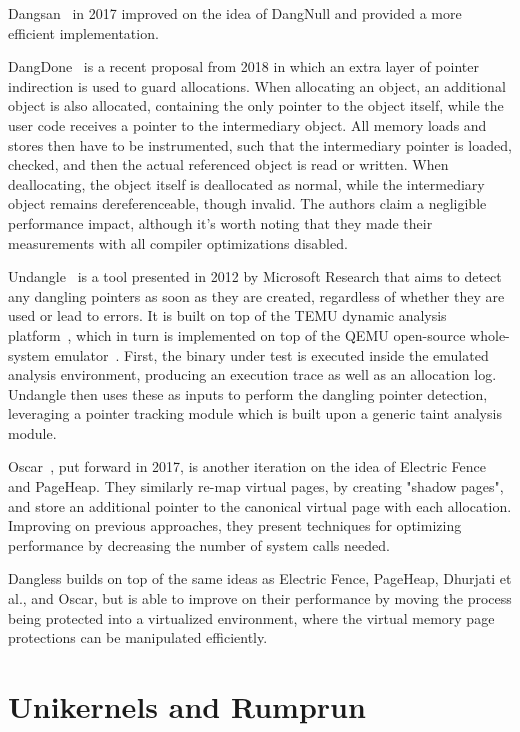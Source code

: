 Dangsan~\cite{dangsan2017} in 2017 improved on the idea of DangNull and provided a more efficient implementation.

DangDone~\cite{dangdone2018} is a recent proposal from 2018 in which an extra layer of pointer indirection is used to guard allocations. When allocating an object, an additional object is also allocated, containing the only pointer to the object itself, while the user code receives a pointer to the intermediary object. All memory loads and stores then have to be instrumented, such that the intermediary pointer is loaded, checked, and then the actual referenced object is read or written. When deallocating, the object itself is deallocated as normal, while the intermediary object remains dereferenceable, though invalid. The authors claim a negligible performance impact, although it's worth noting that they made their measurements with all compiler optimizations disabled.

Undangle~\cite{undangle2012} is a tool presented in 2012 by Microsoft Research that aims to detect any dangling pointers as soon as they are created, regardless of whether they are used or lead to errors. It is built on top of the TEMU dynamic analysis platform~\cite{bitblaze-temu2008}, which in turn is implemented on top of the QEMU open-source whole-system emulator~\cite{qemu-web}. First, the binary under test is executed inside the emulated analysis environment, producing an execution trace as well as an allocation log. Undangle then uses these as inputs to perform the dangling pointer detection, leveraging a pointer tracking module which is built upon a generic taint analysis module.

Oscar~\cite{oscar2017}, put forward in 2017, is another iteration on the idea of Electric Fence and PageHeap. They similarly re-map virtual pages, by creating "shadow pages", and store an additional pointer to the canonical virtual page with each allocation. Improving on previous approaches, they present techniques for optimizing performance by decreasing the number of system calls needed.

Dangless builds on top of the same ideas as Electric Fence, PageHeap, Dhurjati et al., and Oscar, but is able to improve on their performance by moving the process being protected into a virtualized environment, where the virtual memory page protections can be manipulated efficiently.

\section{Unikernels and Rumprun}

